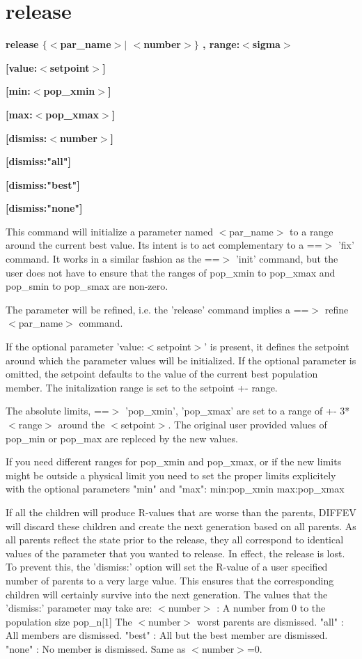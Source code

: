 \section{release}
{\bf release $ \{$$ <$par\_name$> $$| $ $ <$number$> $$\} $ , range:$ <$sigma$> $ \par }
{\bf   [value:$ <$setpoint$> $] \par }
{\bf   [min:$ <$pop\_xmin$> $] \par }
{\bf   [max:$ <$pop\_xmax$> $] \par }
{\bf   [dismiss:$ <$number$> $] \par }
{\bf   [dismiss:"all"] \par }
{\bf   [dismiss:"best"] \par }
{\bf   [dismiss:"none"] \par }
\par
\vspace{3pt}
This command will initialize a parameter named $ <$par\_name$> $ 
to a range around the current best value. Its intent is 
to act complementary to a ==$> $ 'fix' command. It works 
in a similar fashion as the ==$> $ 'init' command, but the user 
does not have to ensure that the ranges of 
pop\_xmin to pop\_xmax and pop\_smin to pop\_smax are non-zero. 
\par
The parameter will be refined, i.e. the 'release' command 
implies a ==$> $ refine $ <$par\_name$> $ command. 
\par
If the optional parameter 'value:$ <$setpoint$> $' is present, 
it defines the setpoint around which the parameter values 
will be initialized. If the optional parameter is omitted, 
the setpoint defaults to the value of the current best 
population member. 
The initalization range is set to the setpoint +- range. 
\par
The absolute limits, ==$> $ 'pop\_xmin', 'pop\_xmax' are set 
to a range of +- 3* $ <$range$> $ around the $ <$setpoint$> $. 
The original user provided values of 
pop\_min or pop\_max are repleced by the new values. 
\par
If you need different ranges for pop\_xmin and pop\_xmax, 
or if the new limits might be 
outside a physical limit you need to set the proper 
limits explicitely with the optional parameters 
"min" and "max": 
   min:pop\_xmin 
   max:pop\_xmax 
\par
If all the children will produce R-values that are worse 
than the parents, DIFFEV will discard these children and 
create the next generation based on all parents. As all 
parents reflect the state prior to the release, they all 
correspond to identical values of the parameter that you 
wanted to release. In effect, the release is lost. 
To prevent this, the 'dismiss:' option will set the R-value 
of a user specified number of parents to a very large 
value. This ensures that the corresponding children will 
certainly survive into the next generation. 
The values that the 'dismiss:' parameter may take are: 
$ <$number$> $  : A number from 0 to the population size pop\_n[1] 
            The $ <$number$> $ worst parents are dismissed. 
"all"     : All members are dismissed. 
"best"    : All but the best member are dismissed. 
"none"    : No member is dismissed. Same as $ <$number$> $=0. 
